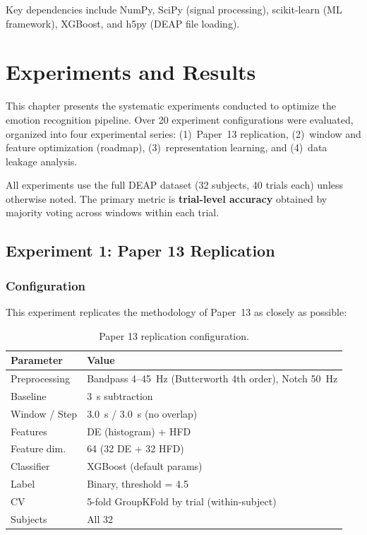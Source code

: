 \documentclass[12pt,a4paper]{report}
\begin{document}
Key dependencies include NumPy, SciPy (signal processing), scikit-learn
(ML framework), XGBoost, and h5py (DEAP file loading).


\chapter{Experiments and Results}
\label{ch:experiments}

This chapter presents the systematic experiments conducted to optimize the
emotion recognition pipeline. Over 20 experiment configurations were evaluated,
organized into four experimental series: (1)~Paper~13 replication,
(2)~window and feature optimization (roadmap), (3)~representation learning,
and (4)~data leakage analysis.

All experiments use the full DEAP dataset (32 subjects, 40 trials each) unless
otherwise noted. The primary metric is \textbf{trial-level accuracy} obtained
by majority voting across windows within each trial.


\section{Experiment 1: Paper 13 Replication}
\label{sec:exp_paper13}

\subsection{Configuration}

This experiment replicates the methodology of Paper~13 as closely as possible:

\begin{table}[H]
\centering
\caption{Paper 13 replication configuration.}
\label{tab:paper13_config}
\begin{tabular}{ll}
\toprule
\textbf{Parameter} & \textbf{Value} \\
\midrule
Preprocessing & Bandpass 4--45~Hz (Butterworth 4th order), Notch 50~Hz \\
Baseline      & 3~s subtraction \\
Window / Step & 3.0~s / 3.0~s (no overlap) \\
Features      & DE (histogram) + HFD \\
Feature dim.  & 64 (32 DE + 32 HFD) \\
Classifier    & XGBoost (default params) \\
Label         & Binary, threshold = 4.5 \\
CV            & 5-fold GroupKFold by trial (within-subject) \\
Subjects      & All 32 \\
\bottomrule
\end{tabular}
\end{table}
\end{document}
